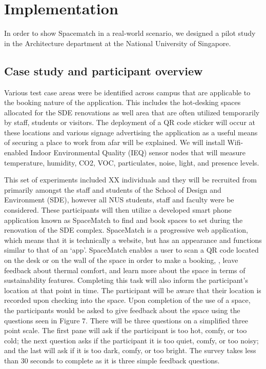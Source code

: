 \documentclass[]{interact}
\theoremstyle{plain}%
\theoremstyle{definition}
\theoremstyle{remark}
\begin{document}
\section{Implementation}
In order to show Spacematch in a real-world scenario, we designed a pilot study in the Architecture department at the National University of Singapore.

\subsection{Case study and participant overview}

Various test case areas were be identified across campus that are applicable to the booking nature of the application. This includes the hot-desking spaces allocated for the SDE renovations as well area that are often utilized temporarily by staff, students or visitors. The deployment of a QR code sticker will occur at these locations and various signage advertising the application as a useful means of securing a place to work from afar will be explained. We will install Wifi-enabled Indoor Environmental Quality (IEQ) sensor nodes that will measure temperature, humidity, CO2, VOC, particulates, noise, light, and presence levels. 

This set of experiments included XX individuals and they will be recruited from primarily amongst the staff and students of the School of Design and Environment (SDE), however all NUS students, staff and faculty were be considered. These participants will then utilize a developed smart phone application known as SpaceMatch to find and book spaces to set during the renovation of the SDE complex. SpaceMatch is a progressive web application, which means that it is technically a website, but has an appearance and functions similar to that of an ‘app’. SpaceMatch enables a user to scan a QR code located on the desk or on the wall of the space in order to make a booking, , leave feedback about thermal comfort, and learn more about the space in terms of sustainability features. Completing this task will also inform the participant’s location at that point in time. The participant will be aware that their location is recorded upon checking into the space. Upon completion of the use of a space, the participants would be asked to give feedback about the space using the questions seen in Figure 7. There will be three questions on a simplified three point scale. The first pane will ask if the participant is too hot, comfy, or too cold; the next question asks if the participant it is too quiet, comfy, or too noisy; and the last will ask if it is too dark, comfy, or too bright. The survey takes less than 30 seconds to complete as it is three simple feedback questions.
\end{document}
